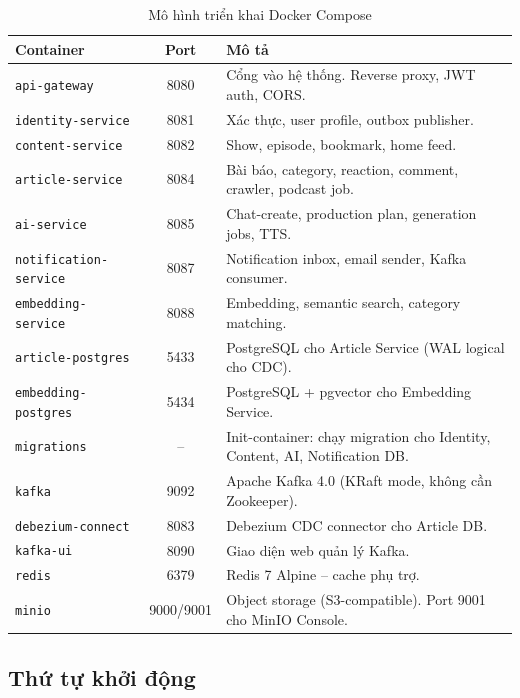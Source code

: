 \documentclass[14pt,a4paper,oneside]{extreport}
\begin{document}
\begin{table}[H]
\centering
\caption{Mô hình triển khai Docker Compose}
\label{tab:deployment}
\renewcommand{\arraystretch}{1.3}
\small
\begin{tabularx}{\textwidth}{|l|c|X|}
\hline
\textbf{Container} & \textbf{Port} & \textbf{Mô tả} \\
\hline
\texttt{api-gateway} & 8080 &
  Cổng vào hệ thống. Reverse proxy, JWT auth, CORS. \\
\hline
\texttt{identity-service} & 8081 &
  Xác thực, user profile, outbox publisher. \\
\hline
\texttt{content-service} & 8082 &
  Show, episode, bookmark, home feed. \\
\hline
\texttt{article-service} & 8084 &
  Bài báo, category, reaction, comment, crawler, podcast job. \\
\hline
\texttt{ai-service} & 8085 &
  Chat-create, production plan, generation jobs, TTS. \\
\hline
\texttt{notification-service} & 8087 &
  Notification inbox, email sender, Kafka consumer. \\
\hline
\texttt{embedding-service} & 8088 &
  Embedding, semantic search, category matching. \\
\hline
\texttt{article-postgres} & 5433 &
  PostgreSQL cho Article Service (WAL logical cho CDC). \\
\hline
\texttt{embedding-postgres} & 5434 &
  PostgreSQL + pgvector cho Embedding Service. \\
\hline
\texttt{migrations} & -- &
  Init-container: chạy migration cho Identity, Content, AI, Notification DB. \\
\hline
\texttt{kafka} & 9092 &
  Apache Kafka 4.0 (KRaft mode, không cần Zookeeper). \\
\hline
\texttt{debezium-connect} & 8083 &
  Debezium CDC connector cho Article DB. \\
\hline
\texttt{kafka-ui} & 8090 &
  Giao diện web quản lý Kafka. \\
\hline
\texttt{redis} & 6379 &
  Redis 7 Alpine -- cache phụ trợ. \\
\hline
\texttt{minio} & 9000/9001 &
  Object storage (S3-compatible). Port 9001 cho MinIO Console. \\
\hline
\end{tabularx}
\end{table}

\subsection{Thứ tự khởi động}
\end{document}
